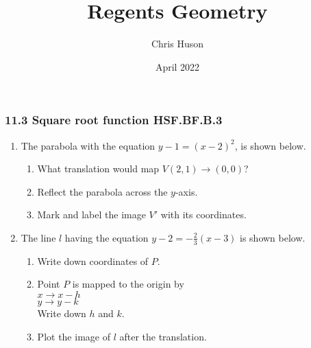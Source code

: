 \documentclass[12pt, twoside]{article}
\title{Regents Geometry}
\author{Chris Huson}
\date{April 2022}
\begin{document}
\subsubsection*{11.3 Square root function \hfill HSF.BF.B.3}
\begin{enumerate}
\item The parabola with the equation $y-1=(x-2)^2$, is shown below. 
\begin{multicols}{2}
  \begin{enumerate}
    \item What translation would map $V(2,1) \rightarrow (0,0)$?\vspace{2cm}
    \item Reflect the parabola across the $y$-axis.
    \item Mark and label the image $V'$ with its coordinates. \vspace{2cm}
  \end{enumerate}
  \begin{flushright}
\end{flushright}
\end{multicols}

\item The line $l$ having the equation $\displaystyle y-2=-\frac{2}{3}(x-3)$ is shown below.
\begin{multicols}{2}
  \begin{enumerate}
    \item Write down coordinates of $P$.
    \item Point $P$ is mapped to the origin by\\ $x \rightarrow x-h$\\ $y \rightarrow y-k$ \\Write down $h$ and $k$.
    \item Plot the image of $l$ after the translation.
  \end{enumerate}
  \begin{flushright}
  \end{flushright}
\end{multicols}%


\end{enumerate}
\end{document}
